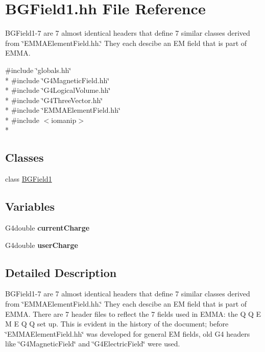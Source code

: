 \hypertarget{BGField1_8hh}{\section{B\-G\-Field1.\-hh File Reference}
\label{BGField1_8hh}
}


B\-G\-Field1-\/7 are 7 almost identical headers that define 7 similar classes derived from \char`\"{}\-E\-M\-M\-A\-Element\-Field.\-hh.\char`\"{} They each descibe an E\-M field that is part of E\-M\-M\-A.  


{\ttfamily \#include \char`\"{}globals.\-hh\char`\"{}}\\*
{\ttfamily \#include \char`\"{}G4\-Magnetic\-Field.\-hh\char`\"{}}\\*
{\ttfamily \#include \char`\"{}G4\-Logical\-Volume.\-hh\char`\"{}}\\*
{\ttfamily \#include \char`\"{}G4\-Three\-Vector.\-hh\char`\"{}}\\*
{\ttfamily \#include \char`\"{}E\-M\-M\-A\-Element\-Field.\-hh\char`\"{}}\\*
{\ttfamily \#include $<$iomanip$>$}\\*
\subsection*{Classes}
\begin{DoxyCompactItemize}
\item 
class \hyperlink{classBGField1}{B\-G\-Field1}
\end{DoxyCompactItemize}
\subsection*{Variables}
\begin{DoxyCompactItemize}
\item 
\hypertarget{BGField1_8hh_acb265d8eecfa1acd31056f0c7915362e}{G4double {\bfseries current\-Charge}}\label{BGField1_8hh_acb265d8eecfa1acd31056f0c7915362e}

\item 
\hypertarget{BGField1_8hh_a2d61cdd1b1b5ed409f7c91b54737c1b9}{G4double {\bfseries user\-Charge}}\label{BGField1_8hh_a2d61cdd1b1b5ed409f7c91b54737c1b9}

\end{DoxyCompactItemize}


\subsection{Detailed Description}
B\-G\-Field1-\/7 are 7 almost identical headers that define 7 similar classes derived from \char`\"{}\-E\-M\-M\-A\-Element\-Field.\-hh.\char`\"{} They each descibe an E\-M field that is part of E\-M\-M\-A. There are 7 header files to reflect the 7 fields used in E\-M\-M\-A\-: the Q Q E M E Q Q set up. This is evident in the history of the document; before \char`\"{}\-E\-M\-M\-A\-Element\-Field.\-hh\char`\"{} was developed for general E\-M fields, old G4 headers like \char`\"{}\-G4\-Magnetic\-Field\char`\"{} and \char`\"{}\-G4\-Electric\-Field\char`\"{} were used. 